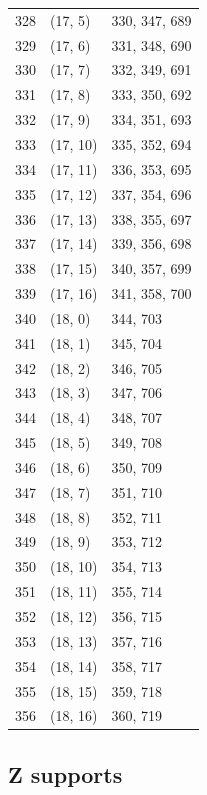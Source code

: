 \documentclass{article}
\begin{document}
\begin{longtable}{lll}
  328 & (17, 5) & 330, 347, 689 \\
  329 & (17, 6) & 331, 348, 690 \\
  330 & (17, 7) & 332, 349, 691 \\
  331 & (17, 8) & 333, 350, 692 \\
  332 & (17, 9) & 334, 351, 693 \\
  333 & (17, 10) & 335, 352, 694 \\
  334 & (17, 11) & 336, 353, 695 \\
  335 & (17, 12) & 337, 354, 696 \\
  336 & (17, 13) & 338, 355, 697 \\
  337 & (17, 14) & 339, 356, 698 \\
  338 & (17, 15) & 340, 357, 699 \\
  339 & (17, 16) & 341, 358, 700 \\
  340 & (18, 0) & 344, 703 \\
  341 & (18, 1) & 345, 704 \\
  342 & (18, 2) & 346, 705 \\
  343 & (18, 3) & 347, 706 \\
  344 & (18, 4) & 348, 707 \\
  345 & (18, 5) & 349, 708 \\
  346 & (18, 6) & 350, 709 \\
  347 & (18, 7) & 351, 710 \\
  348 & (18, 8) & 352, 711 \\
  349 & (18, 9) & 353, 712 \\
  350 & (18, 10) & 354, 713 \\
  351 & (18, 11) & 355, 714 \\
  352 & (18, 12) & 356, 715 \\
  353 & (18, 13) & 357, 716 \\
  354 & (18, 14) & 358, 717 \\
  355 & (18, 15) & 359, 718 \\
  356 & (18, 16) & 360, 719 \\
\end{longtable}

\subsection{Z supports}\label{app:z-supports}
\end{document}
